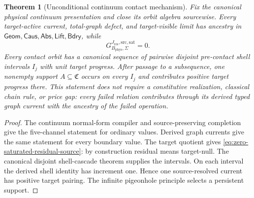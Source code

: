 \documentclass[11pt]{article}
\numberwithin{section}{part}
\theoremstyle{plain}
\newtheorem{theorem}{Theorem}[section]
\theoremstyle{definition}
\theoremstyle{remark}
\newcommand{\Geom}{\mathsf{Geom}}
\newcommand{\Caus}{\mathsf{Caus}}
\newcommand{\Abs}{\mathsf{Abs}}
\newcommand{\Lift}{\mathsf{Lift}}
\newcommand{\Bdry}{\mathsf{Bdry}}
\newcommand{\Res}{J_{\mathrm{res}}}
\newcommand{\Channels}{\mathfrak C}
\newcommand{\Phys}{\mathrm{phys}}
\newcommand{\Sat}{\mathrm{sat}}
\newcommand{\Budget}{B_{\Phys}}
\begin{document}
\begin{theorem}[Unconditional continuum contact mechanism]
\label{thm:unconditional-continuum-contact-alternative}
Fix the canonical physical continuum presentation and close its orbit algebra
sourcewise.  Every target-active current, total-graph defect, and
target-visible limit has ancestry in
\(\Geom,\Caus,\Abs,\Lift,\Bdry\), while
\begin{equation}
 \label{eq:zero-saturated-residual-source}
 G_{\Budget,\Sigma}^{\Res,\mathrm{src},\Sat}=0.
\end{equation}
Every contact orbit has a canonical sequence of pairwise disjoint
pre-contact shell intervals \(I_j\) with unit target progress.  After passage
to a subsequence, one nonempty support \(A\subseteq\Channels\) occurs on
every \(I_j\) and contributes positive target progress there.  This statement
does not require a constitutive realization, classical chain rule, or price
gap: every failed relation contributes through its derived typed graph current
with the ancestry of the failed operation.
\end{theorem}

\begin{proof}
The continuum normal-form compiler and source-preserving completion give the
five-channel statement for ordinary values.  Derived graph currents give the
same statement for every boundary value.  The target quotient gives
\eqref{eq:zero-saturated-residual-source}: by construction residual means
target-null.  The canonical disjoint
shell-cascade theorem supplies the intervals.  On each interval the derived
shell identity has increment one.  Hence one source-resolved current has
positive target pairing.  The infinite pigeonhole principle selects a
persistent support.
\end{proof}
\end{document}
